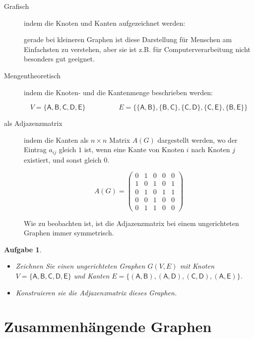 \documentclass[12pt,a4paper]{report}
\theoremstyle{break}
\newtheorem{exercise}{Aufgabe}[section]
\theoremstyle{plain}
\begin{document}
\begin{description}
\item[Grafisch] indem die Knoten und Kanten aufgezeichnet werden:


gerade bei kleineren Graphen ist diese Darstellung f\"{u}r Menschen am
Einfachsten zu verstehen, aber sie ist z.B. f\"{u}r
Computerverarbeitung nicht besonders gut geeignet.
\item[Mengentheoretisch] indem die Knoten- und die Kantenmenge
  beschrieben werden:

\begin{displaymath}
V = \{\mathsf{A,B,C,D,E}\}\hspace{2cm}E = \{\mathsf{\{A,B\}, \{B,C\},
  \{C,D\}, \{C,E\}, \{B,E\}}\}
\end{displaymath}

\item[\textnormal{als} Adjazenzmatrix] indem die Kanten als $n\times{n}$ Matrix $A(G)$
  dargestellt werden, wo der Eintrag $a_{ij}$ gleich $1$ ist, wenn eine Kante
  von Knoten $i$ nach Knoten $j$ existiert, und sonst gleich $0$.

\begin{displaymath}
A(G) = \left( 
\begin{array}{ccccc}
0 & 1 & 0 & 0 & 0 \\
1 & 0 & 1 & 0 & 1 \\
0 & 1 & 0 & 1 & 1 \\
0 & 0 & 1 & 0 & 0 \\
0 & 1 & 1 & 0 & 0 
\end{array}
\right)
\end{displaymath}

Wie zu beobachten ist, ist die Adjazenzmatrix bei einem ungerichteten
Graphen immer symmetrisch.
\end{description}

\begin{exercise}\label{exrep}
\begin{itemize}
\item Zeichnen Sie einen ungerichteten Graphen $G(V,E)$ mit Knoten 
$V = \{\mathsf{A,B,C,D,E}\}$ und Kanten 
$E = \{\mathsf{(A, B), (A, D), (C, D), (A, E)}\}$.
\item Konstruieren sie die Adjazenzmatrix dieses Graphen.
\end{itemize}
\end{exercise}

\section{Zusammenh\"{a}ngende Graphen}
\end{document}
